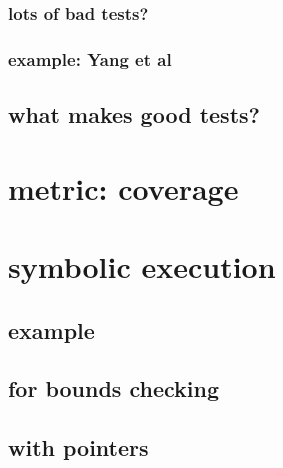 \subsubsection{lots of bad tests?}


\subsubsection{example: Yang et al}


\subsection{what makes good tests?} %


\section{metric: coverage}


\section{symbolic execution}


\subsection{example}


\subsection{for bounds checking}


\subsection{with pointers}





